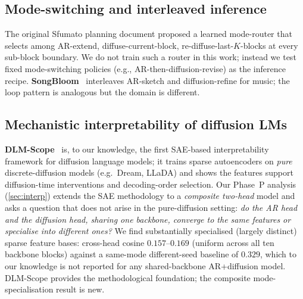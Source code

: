\subsection{Mode-switching and interleaved inference}

The original Sfumato planning document proposed a learned mode-router
that selects among AR-extend, diffuse-current-block,
re-diffuse-last-$K$-blocks at every sub-block boundary. We do not
train such a router in this work; instead we test fixed
mode-switching policies (e.g., AR-then-diffusion-revise) as the
inference recipe. \textbf{SongBloom}~\citep{wang2025songbloom}
interleaves AR-sketch and diffusion-refine for music; the loop
pattern is analogous but the domain is different.

\subsection{Mechanistic interpretability of diffusion LMs}

\textbf{DLM-Scope}~\citep{wang2026dlmscope} is, to our knowledge, the
first SAE-based interpretability framework for diffusion language
models; it trains sparse autoencoders on \emph{pure} discrete-diffusion
models (e.g.\ Dream, LLaDA) and shows the features support
diffusion-time interventions and decoding-order selection. Our Phase~P
analysis (\textsection\ref{sec:interp}) extends the SAE methodology to
a \emph{composite two-head} model and asks a question that does not
arise in the pure-diffusion setting: \emph{do the AR head and the
diffusion head, sharing one backbone, converge to the same features or
specialise into different ones?} We find substantially specialised
(largely distinct) sparse feature bases: cross-head cosine
$0.157$--$0.169$ (uniform across all ten backbone blocks) against a
same-mode different-seed baseline of $0.329$, which to our knowledge
is not reported for any shared-backbone AR+diffusion model. DLM-Scope provides the
methodological foundation; the composite mode-specialisation result is
new.

